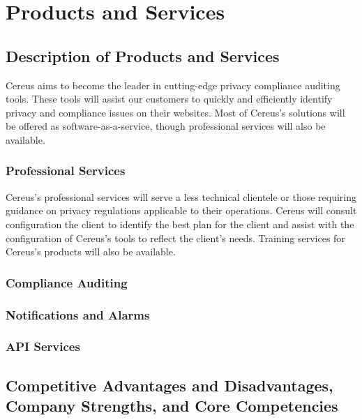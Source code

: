 {\let\cleardoublepage\relax \chapter{Products and Services}}

{\let\clearpage\relax \section{Description of Products and Services}}

Cereus aims to become the leader in cutting-edge privacy compliance auditing tools. These tools will assist our customers to quickly and efficiently identify privacy and compliance issues on their websites. Most of Cereus's solutions will be offered as software-as-a-service, though professional services will also be available.

\subsection{Professional Services}

Cereus's professional services will serve a less technical clientele or those requiring guidance on privacy regulations applicable to their operations. Cereus will consult configuration the client to identify the best plan for the client and assist with the configuration of Cereus's tools to reflect the client's needs. Training services for Cereus's products will also be available.

\subsection{Compliance Auditing}



\subsection{Notifications and Alarms}

\subsection{API Services}

\section{Competitive Advantages and Disadvantages, Company Strengths, and Core Competencies}

